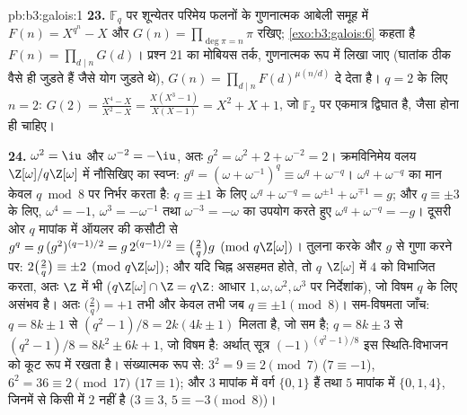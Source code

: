 \begin{solution}{pb:b3:galois:1}
\textbf{23.} $\mathbb F_q$ पर शून्येतर परिमेय फलनों के गुणनात्मक आबेली समूह
में $F(n) = X^{q^n} -
X$ और $G(n) = \prod_{\deg\pi = n}\pi$ रखिए; \cref{exo:b3:galois:6} कहता है $F(n) = \prod_{d\mid n}G(d)$। प्रश्न 21 का मोबियस
तर्क, गुणनात्मक रूप में लिखा जाए (घातांक ठीक वैसे ही जुड़ते हैं
जैसे योग जुड़ते थे), $G(n) = \prod_{d \mid n}F(d)^{\mu(n/d)}$ दे देता है। $q = 2$ के लिए $n = 2$: $G(2) = \frac{X^4 - X}{X^2 - X} = \frac{X(X^3 -
1)}{X(X - 1)} = X^2 + X + 1$,
जो $\mathbb F_2$ पर एकमात्र  द्विघात है, जैसा होना ही चाहिए।

\textbf{24.} $\omega^2 = \iu$ और $\omega^{-2} = -\iu$, अतः $g^2 = \omega^2 + 2 + \omega^{-2} = 2$। क्रमविनिमेय वलय $\Z[\omega]/q\Z[\omega]$ में
नौसिखिए का स्वप्न: $g^q =
(\omega + \omega^{-1})^q \equiv \omega^q + \omega^{-q}$। $\omega^q + \omega^{-q}$ का मान केवल $q \bmod 8$ पर निर्भर करता
है: $q \equiv \pm1$ के लिए $\omega^q + \omega^{-q} = \omega^{\pm1} +
\omega^{\mp1} = g$; और $q \equiv \pm3$ के लिए, $\omega^4 =
-1$, $\omega^{3} = -\omega^{-1}$ तथा $\omega^{-3} = -\omega$ का
उपयोग करते हुए $\omega^q + \omega^{-q} = -g$। दूसरी ओर $q$ मापांक में ऑयलर की कसौटी से
$g^q =
g\,(g^2)^{(q-1)/2} = g\,2^{(q-1)/2} \equiv \bigl(\frac2q\bigr)
g \pmod{q\Z[\omega]}$। तुलना करके और $g$ से गुणा करने पर: $2\bigl(\frac2q\bigr) \equiv
\pm2 \pmod{q\Z[\omega]}$; और यदि चिह्न
असहमत होते, तो $q$ $\Z[\omega]$ में $4$ को विभाजित करता, अतः $\Z$ में
भी ($q\Z[\omega] \cap
\Z = q\Z$: आधार $1, \omega, \omega^2,
\omega^3$ पर निर्देशांक), जो विषम $q$ के लिए असंभव
है। अतः $\bigl(\frac2q\bigr) =
+1$ तभी और केवल तभी जब $q \equiv \pm1 \pmod 8$। सम-विषमता जाँच: $q = 8k \pm 1$ से
$(q^2 - 1)/8 = 2k(4k \pm 1)$ मिलता है, जो सम है; $q = 8k \pm 3$ से $(q^2 - 1)/8 = 8k^2 \pm 6k + 1$, जो विषम है: अर्थात् सूत्र
$(-1)^{(q^2-1)/8}$ इस स्थिति-विभाजन को कूट रूप में रखता है। संख्यात्मक रूप से:
$3^2
= 9 \equiv 2 \pmod 7$ ($7 \equiv -1$), $6^2 = 36 \equiv 2
\pmod{17}$ ($17 \equiv 1$); और $3$ मापांक में वर्ग $\{0,
1\}$ हैं
तथा $5$ मापांक में $\{0, 1, 4\}$, जिनमें से किसी में $2$ नहीं है ($3 \equiv 3$,
$5 \equiv -3 \pmod 8$)।


\end{solution}

